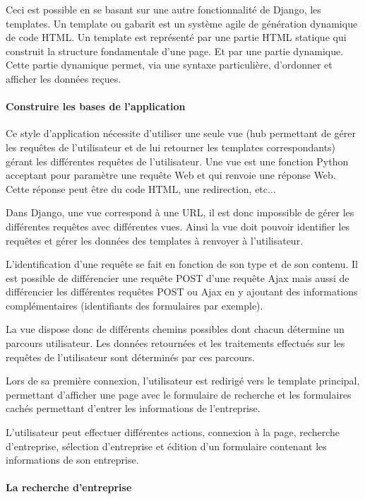 \documentclass[french]{article}
\begin{document}
{Ceci est possible en se basant sur une autre fonctionnalité de Django, les templates. Un template ou gabarit est un système agile de génération dynamique de code HTML. Un template est représenté par une partie HTML statique qui construit la structure fondamentale d'une page. Et par une partie dynamique. Cette partie dynamique permet, via une syntaxe particulière, d'ordonner et afficher les données reçues.

\paragraph{Construire les bases de l'application}

Ce style d'application nécessite d'utiliser une seule vue (hub permettant de gérer les requêtes de l'utilisateur et de lui retourner les templates correspondants) gérant les différentes requêtes de l'utilisateur. Une vue est une fonction Python acceptant pour paramètre une requête Web et qui renvoie une réponse Web. Cette réponse peut être du code HTML, une redirection, etc...

Dans Django, une vue correspond à une URL, il est donc impossible de gérer les différentes requêtes avec différentes vues. Ainsi la vue doit pouvoir identifier les requêtes et gérer les données des templates à renvoyer à l'utilisateur.

L'identification d'une requête se fait en fonction de son type et de son contenu. Il est possible de différencier une requête POST d'une requête Ajax mais aussi de différencier les différentes requêtes POST ou Ajax en y ajoutant des informations complémentaires (identifiants des formulaires par exemple).

La vue dispose donc de différents chemins possibles dont chacun détermine un parcours utilisateur. Les données retournées et les traitements effectués sur les requêtes de l'utilisateur sont déterminés par ces parcours. 

Lors de sa première connexion, l'utilisateur est redirigé vers le template principal, permettant d'afficher une page avec le formulaire de recherche et les formulaires cachés permettant d'entrer les informations de l'entreprise.

L'utilisateur peut effectuer différentes actions, connexion à la page, recherche d'entreprise, sélection d'entreprise et édition d'un formulaire contenant les informations de son entreprise.

\paragraph{La recherche d'entreprise}

}
\end{document}
